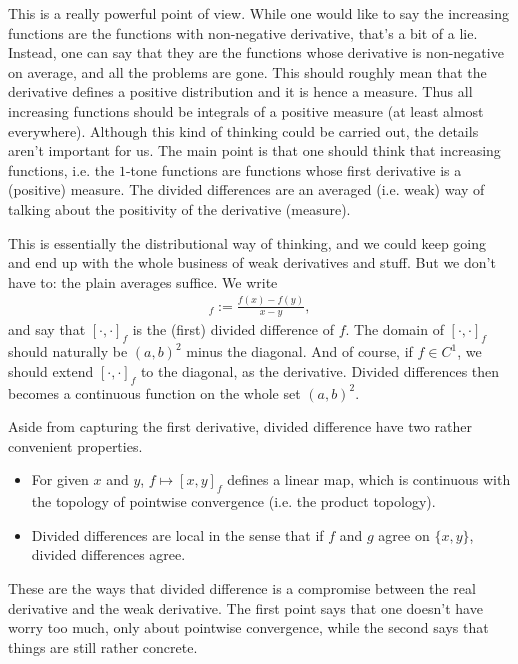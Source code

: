 This is a really powerful point of view. While one would like to say the increasing functions are the functions with non-negative derivative, that's a bit of a lie. Instead, one can say that they are the functions whose derivative is non-negative on average, and all the problems are gone. This should roughly mean that the derivative defines a positive distribution and it is hence a measure. Thus all increasing functions should be integrals of a positive measure (at least almost everywhere). Although this kind of thinking could be carried out, the details aren't important for us. The main point is that one should think that increasing functions, i.e. the $1$-tone functions are functions whose first derivative is a (positive) measure. The divided differences are an averaged (i.e. weak) way of talking about the positivity of the derivative (measure).

This is essentially the distributional way of thinking, and we could keep going and end up with the whole business of weak derivatives and stuff. But we don't have to: the plain averages suffice. We write
\begin{align*}
	[x, y]_{f} := \frac{f(x) - f(y)}{x - y},
\end{align*}
and say that $[\cdot, \cdot]_{f}$ is the (first) divided difference of $f$. The domain of $[\cdot, \cdot]_{f}$ should naturally be $(a, b)^{2}$ minus the diagonal. And of course, if $f \in C^{1}$, we should extend $[\cdot, \cdot]_{f}$ to the diagonal, as the derivative. Divided differences then becomes a continuous function on the whole set $(a, b)^2$.

Aside from capturing the first derivative, divided difference have two rather convenient properties.

\begin{itemize}
	\item For given $x$ and $y$, $f \mapsto [x, y]_{f}$ defines a linear map, which is continuous with the topology of pointwise convergence (i.e. the product topology).
	\item Divided differences are local in the sense that if $f$ and $g$ agree on $\{x, y\}$, divided differences agree.
\end{itemize}

These are the ways that divided difference is a compromise between the real derivative and the weak derivative. The first point says that one doesn't have worry too much, only about pointwise convergence, while the second says that things are still rather concrete.

